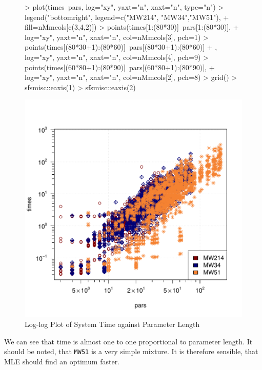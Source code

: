 \begin{figure}[h!]
    \begin{Rgraph}[0.9]
\begin{Schunk}
\begin{Sinput}
>     plot(times~pars, log="xy", yaxt="n", xaxt="n", type="n")
>     legend("bottomright", legend=c("MW214", "MW34","MW51"),
+            fill=nMmcols[c(3,4,2)])
>     points(times[1:(80*30)]~pars[1:(80*30)], 
+            log="xy", yaxt="n", xaxt="n", col=nMmcols[3], pch=1)
>     points(times[(80*30+1):(80*60)]~pars[(80*30+1):(80*60)]
+            , log="xy", yaxt="n", xaxt="n", col=nMmcols[4], pch=9)
>     points(times[(60*80+1):(80*90)]~pars[(60*80+1):(80*90)], 
+            log="xy", yaxt="n", xaxt="n", col=nMmcols[2], pch=8)
>     grid()
>     sfsmisc::eaxis(1)
>     sfsmisc::eaxis(2)
\end{Sinput}
\end{Schunk}
\includegraphics{chapter3-figtime}
    \caption{Log-log Plot of System Time against Parameter Length}
    \label{fig:time}
    \end{Rgraph}
\end{figure}

We can see that time is almost one to one proportional to parameter length.
It should be noted, that {\tt MW51} is a very simple mixture. It is therefore 
sensible, that MLE should find an optimum faster.

